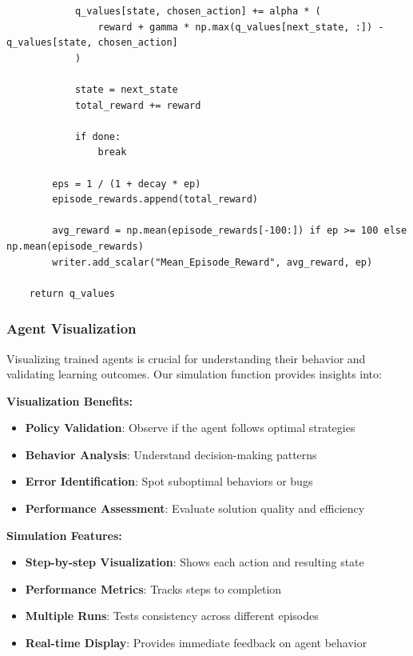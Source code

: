 \documentclass[12pt]{article}
\begin{document}
{{{\begin{verbatim}
            q_values[state, chosen_action] += alpha * (
                reward + gamma * np.max(q_values[next_state, :]) - q_values[state, chosen_action]
            )
    
            state = next_state
            total_reward += reward
    
            if done:
                break
    
        eps = 1 / (1 + decay * ep)
        episode_rewards.append(total_reward)
        
        avg_reward = np.mean(episode_rewards[-100:]) if ep >= 100 else np.mean(episode_rewards)
        writer.add_scalar("Mean_Episode_Reward", avg_reward, ep)
    
    return q_values
\end{verbatim}

\subsubsection{Agent Visualization}

Visualizing trained agents is crucial for understanding their behavior and validating learning outcomes. Our simulation function provides insights into:

\textbf{Visualization Benefits:}
\begin{itemize}
    \item \textbf{Policy Validation}: Observe if the agent follows optimal strategies
    \item \textbf{Behavior Analysis}: Understand decision-making patterns
    \item \textbf{Error Identification}: Spot suboptimal behaviors or bugs
    \item \textbf{Performance Assessment}: Evaluate solution quality and efficiency
\end{itemize}

\textbf{Simulation Features:}
\begin{itemize}
    \item \textbf{Step-by-step Visualization}: Shows each action and resulting state
    \item \textbf{Performance Metrics}: Tracks steps to completion
    \item \textbf{Multiple Runs}: Tests consistency across different episodes
    \item \textbf{Real-time Display}: Provides immediate feedback on agent behavior
\end{itemize}

}}}
\end{document}
